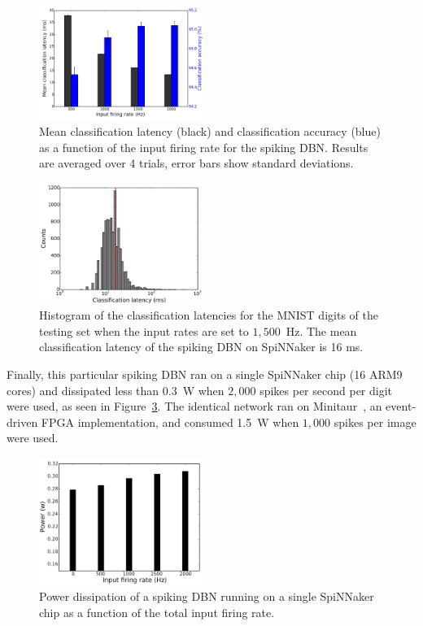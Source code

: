 \documentclass{frontiersENG} %
\begin{document}
\begin{figure}[hbt!]
	\centering
	\includegraphics[width=0.48\textwidth]{fig10}
	\caption{Mean classification latency (black) and classification accuracy (blue) as a function of the input firing rate for the spiking DBN. Results are averaged over 4 trials, error bars show standard deviations.}
	\label{Fig:brianLatency}
\end{figure} 



\begin{figure}[hbt!]
	\centering
	\includegraphics[width=0.48\textwidth]{fig11}
	\caption{Histogram of the classification latencies for the MNIST digits of the testing set when the input rates are set to $1,500$~Hz. The mean classification latency of the spiking DBN on SpiNNaker is 16 ms.}
	\label{Fig:spinnLatency1500hz}
\end{figure} 

Finally, this particular spiking DBN ran on a single SpiNNaker chip (16 ARM9 cores) and dissipated less than 0.3~W when $2,000$ spikes per second per digit were used, as seen in Figure~\ref{Fig:spinnchipPower}. The identical network ran on Minitaur~\citep{neil2014minitaur}, an event-driven FPGA implementation, and consumed 1.5~W when $1,000$ spikes per image were used.  


\begin{figure}[hbt!]
	\centering
	\includegraphics[width=0.48\textwidth]{fig12}
	\caption{Power dissipation of a spiking DBN running on a single SpiNNaker chip as a function of the total input firing rate.}
	\label{Fig:spinnchipPower}
\end{figure} 
\end{document}
